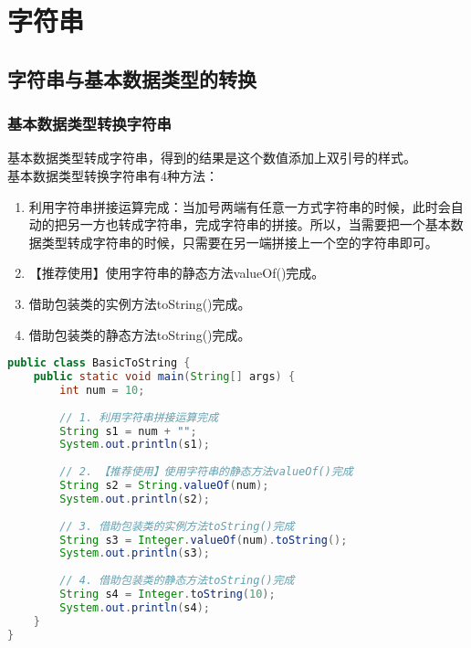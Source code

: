 \chapter{字符串}

\section{字符串与基本数据类型的转换}

\subsection{基本数据类型转换字符串}

基本数据类型转成字符串，得到的结果是这个数值添加上双引号的样式。 \\

基本数据类型转换字符串有4种方法：

\begin{enumerate}
	\item 利用字符串拼接运算完成：当加号两端有任意一方式字符串的时候，此时会自动的把另一方也转成字符串，完成字符串的拼接。所以，当需要把一个基本数据类型转成字符串的时候，只需要在另一端拼接上一个空的字符串即可。

	\item 【推荐使用】使用字符串的静态方法valueOf()完成。

	\item 借助包装类的实例方法toString()完成。

	\item 借助包装类的静态方法toString()完成。
\end{enumerate}

\vspace{0.5cm}


\begin{lstlisting}[language=Java]
public class BasicToString {
    public static void main(String[] args) {
        int num = 10;
        
        // 1. 利用字符串拼接运算完成
        String s1 = num + "";
        System.out.println(s1);
        
        // 2. 【推荐使用】使用字符串的静态方法valueOf()完成
        String s2 = String.valueOf(num);
        System.out.println(s2);
        
        // 3. 借助包装类的实例方法toString()完成
        String s3 = Integer.valueOf(num).toString();
        System.out.println(s3);
        
        // 4. 借助包装类的静态方法toString()完成
        String s4 = Integer.toString(10);
        System.out.println(s4);
    }
}
\end{lstlisting}

